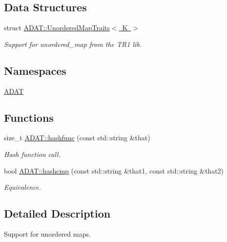 \subsection*{Data Structures}
\begin{DoxyCompactItemize}
\item 
struct \mbox{\hyperlink{structADAT_1_1UnorderedMapTraits}{A\+D\+A\+T\+::\+Unordered\+Map\+Traits$<$ K $>$}}
\begin{DoxyCompactList}\small\item\em Support for unordered\+\_\+map from the T\+R1 lib. \end{DoxyCompactList}\end{DoxyCompactItemize}
\subsection*{Namespaces}
\begin{DoxyCompactItemize}
\item 
 \mbox{\hyperlink{namespaceADAT}{A\+D\+AT}}
\end{DoxyCompactItemize}
\subsection*{Functions}
\begin{DoxyCompactItemize}
\item 
size\+\_\+t \mbox{\hyperlink{namespaceADAT_ac0708a73475d6ed645b663e2d919f90b}{A\+D\+A\+T\+::hashfunc}} (const std\+::string \&that)
\begin{DoxyCompactList}\small\item\em Hash function call. \end{DoxyCompactList}\item 
bool \mbox{\hyperlink{namespaceADAT_a3145f853c462f1c95b958f5deb7709a5}{A\+D\+A\+T\+::hashcmp}} (const std\+::string \&that1, const std\+::string \&that2)
\begin{DoxyCompactList}\small\item\em Equivalence. \end{DoxyCompactList}\end{DoxyCompactItemize}


\subsection{Detailed Description}
Support for unordered maps. 

